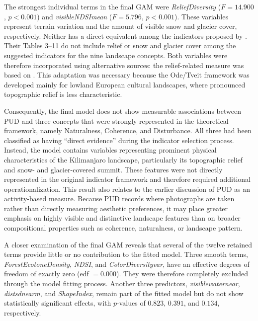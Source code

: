 \documentclass[11pt]{article}
\renewcommand{\_}{\textunderscore\allowbreak{}}
\begin{document}
The strongest individual terms in the final GAM were \textit{ReliefDiversity} ($F = 14.900$, $p < 0.001$) and \textit{visible\_NDSI\_mean} ($F = 5.796$, $p < 0.001$). These variables represent terrain variation and the amount of visible snow and glacier cover, respectively. Neither has a direct equivalent among the indicators proposed by \citet{ode_capturing_2008}. Their Tables 3--11 do not include relief or snow and glacier cover among the suggested indicators for the nine landscape concepts. Both variables were therefore incorporated using alternative sources: the relief-related measure was based on \citet{frank_landscape_2017}. This adaptation was necessary because the Ode/Tveit framework was developed mainly for lowland European cultural landscapes, where pronounced topographic relief is less characteristic.

Consequently, the final model does not show measurable associations between PUD and three concepts that were strongly represented in the theoretical framework, namely Naturalness, Coherence, and Disturbance. All three had been classified as having ``direct evidence'' during the indicator selection process. Instead, the model contains variables representing prominent physical characteristics of the Kilimanjaro landscape, particularly its topographic relief and snow- and glacier-covered summit. These features were not directly represented in the original indicator framework and therefore required additional operationalization. This result also relates to the earlier discussion of PUD as an activity-based measure. Because PUD records where photographs are taken rather than directly measuring aesthetic preferences, it may place greater emphasis on highly visible and distinctive landscape features than on broader compositional properties such as coherence, naturalness, or landscape pattern.

A closer examination of the final GAM reveals that several of the twelve retained terms provide little or no contribution to the fitted model. Three smooth terms, \textit{ForestEcotoneDensity}, \textit{NDSI}, and \textit{ColorDiversity\_var}, have an effective degrees of freedom of exactly zero (edf $= 0.000$). They were therefore completely excluded through the model fitting process. Another three predictors, \textit{visible\_water\_near}, \textit{dist\_sd\_near\_m}, and \textit{ShapeIndex}, remain part of the fitted model but do not show statistically significant effects, with $p$-values of $0.823$, $0.391$, and $0.134$, respectively.
\end{document}
